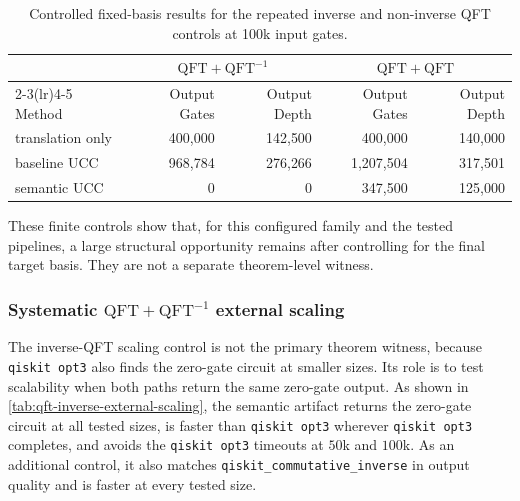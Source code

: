 \begin{table}[!t]
\centering
\begin{tabular}{lrr rr}
\toprule
& \multicolumn{2}{c}{$\mathrm{QFT}+\mathrm{QFT}^{-1}$}
& \multicolumn{2}{c}{$\mathrm{QFT}+\mathrm{QFT}$} \\
\cmidrule(lr){2-3}\cmidrule(lr){4-5}
Method & Output Gates & Output Depth & Output Gates & Output Depth \\
\midrule
translation only & 400{,}000 & 142{,}500 & 400{,}000 & 140{,}000 \\
baseline UCC & 968{,}784 & 276{,}266 & 1{,}207{,}504 & 317{,}501 \\
semantic UCC & 0 & 0 & 347{,}500 & 125{,}000 \\
\bottomrule
\end{tabular}
\caption{Controlled fixed-basis results for the repeated inverse and
non-inverse QFT controls at 100k input gates.}
\label{tab:qft-inverse-fixed}
\label{tab:qft-control-fixed}
\end{table}

These finite controls show that, for this configured family and the tested
pipelines, a large structural opportunity remains after controlling for the
final target basis.  They are not a separate theorem-level witness.


\subsubsection{Systematic \texorpdfstring{$\mathrm{QFT}+\mathrm{QFT}^{-1}$}{QFT+inverse-QFT} external scaling}

The inverse-QFT scaling control is not the primary theorem witness, because
\texttt{qiskit opt3} also finds the zero-gate circuit at smaller sizes. Its role
is to test scalability when both paths return the same zero-gate output. As shown in
\cref{tab:qft-inverse-external-scaling}, the semantic artifact returns the
zero-gate circuit at all tested sizes, is faster than \texttt{qiskit opt3}
wherever \texttt{qiskit opt3} completes, and avoids the \texttt{qiskit opt3}
timeouts at $50$k and $100$k. As an additional control, it also matches
\texttt{qiskit\_commutative\_inverse} in output quality and is faster at every
tested size.

